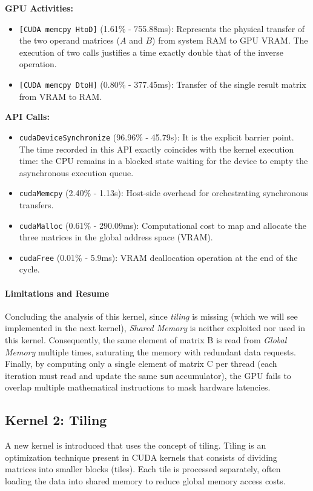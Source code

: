 \textbf{GPU Activities:}
\begin{itemize}
    \item \texttt{[CUDA memcpy HtoD]} (1.61\% - 755.88ms): Represents the physical transfer of the two operand matrices ($A$ and $B$) from system RAM to GPU VRAM. The execution of two calls justifies a time exactly double that of the inverse operation.
    \item \texttt{[CUDA memcpy DtoH]} (0.80\% - 377.45ms): Transfer of the single result matrix from VRAM to RAM.
\end{itemize}

\textbf{API Calls:}
\begin{itemize}
    \item \texttt{cudaDeviceSynchronize} (96.96\% - 45.79s): It is the explicit barrier point. The time recorded in this API exactly coincides with the kernel execution time: the CPU remains in a blocked state waiting for the device to empty the asynchronous execution queue.
    \item \texttt{cudaMemcpy} (2.40\% - 1.13s): Host-side overhead for orchestrating synchronous transfers.
    \item \texttt{cudaMalloc} (0.61\% - 290.09ms): Computational cost to map and allocate the three matrices in the global address space (VRAM).
    \item \texttt{cudaFree} (0.01\% - 5.9ms): VRAM deallocation operation at the end of the cycle.
\end{itemize}


\paragraph{Limitations and Resume}
Concluding the analysis of this kernel, since \textit{tiling} is missing (which we will see implemented in the next kernel), \textit{Shared Memory} is neither exploited nor used in this kernel. Consequently, the same element of matrix B is read from \textit{Global Memory} multiple times, saturating the memory with redundant data requests. Finally, by computing only a single element of matrix C per thread (each iteration must read and update the same \texttt{sum} accumulator), the GPU fails to overlap multiple mathematical instructions to mask hardware latencies.


\subsection{Kernel 2: Tiling}
A new kernel is introduced that uses the concept of tiling. Tiling is an optimization technique present in CUDA kernels that consists of dividing matrices into smaller blocks (tiles). Each tile is processed separately, often loading the data into shared memory to reduce global memory access costs. 

